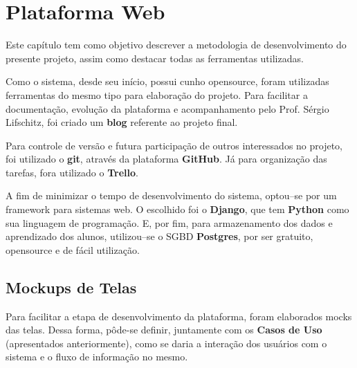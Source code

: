 \documentclass[graduacao,brazil]{ThesisPUC}
\begin{document}

\chapter{Plataforma Web}

Este cap\'{i}tulo tem como objetivo descrever a metodologia de desenvolvimento do presente projeto,
assim como destacar todas as ferramentas utilizadas.

Como o sistema, desde seu in\'{i}cio, possui cunho opensource, foram utilizadas ferramentas do mesmo
tipo para elabora\c{c}\~{a}o do projeto. Para facilitar a documenta\c{c}\~{a}o, evolu\c{c}\~{a}o da plataforma e
acompanhamento pelo Prof. S\'{e}rgio Lifschitz, foi criado um \textbf{blog} \cite{Blog} referente ao projeto final.

Para controle de vers\~{a}o e futura participa\c{c}\~{a}o de outros interessados no projeto, foi utilizado
o \textbf{git}, atrav\'{e}s da plataforma \textbf{GitHub}. J\'{a} para organiza\c{c}\~{a}o das tarefas, fora
utilizado o \textbf{Trello}.

A fim de minimizar o tempo de desenvolvimento do sistema, optou--se por um framework para sistemas web.
O escolhido foi o \textbf{Django}, que tem \textbf{Python} como sua linguagem de programa\c{c}\~{a}o.
E, por fim, para armazenamento dos dados e aprendizado dos alunos, utilizou--se o SGBD \textbf{Postgres},
por ser gratuito, opensource e de f\'{a}cil utiliza\c{c}\~{a}o.


\section{Mockups de Telas}

Para facilitar a etapa de desenvolvimento da plataforma, foram elaborados mocks das telas.
Dessa forma, p\^{o}de-se definir, juntamente com os \textbf{Casos de Uso} (apresentados anteriormente), como
se daria a intera\c{c}\~{a}o dos usu\'{a}rios com o sistema e o fluxo de informa\c{c}\~{a}o no
mesmo.
\end{document}
